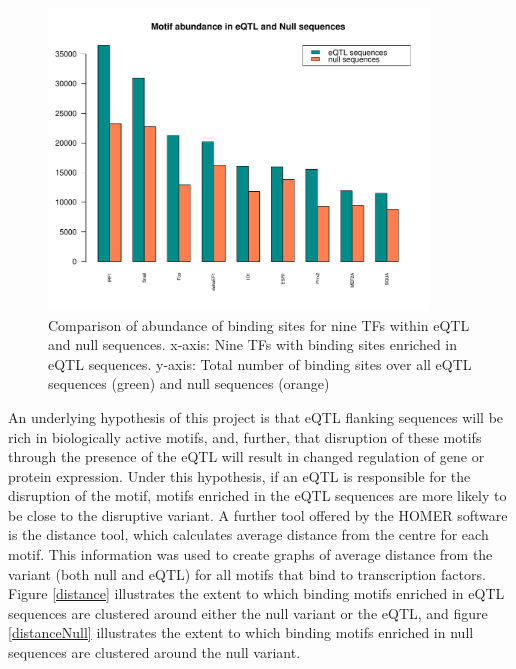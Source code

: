 \documentclass[12pt]{article}
\begin{document}
\begin{figure}[!htbp]
\centering
\includegraphics[width= 0.9\textwidth]{Top9TFsComparison.pdf} 
\caption{Comparison of abundance of binding sites for nine TFs within eQTL and null sequences. x-axis: Nine TFs with binding sites enriched in eQTL sequences. y-axis: Total number of binding sites over all eQTL sequences (green) and null sequences (orange)} 
\label{top9Comparison}
\end{figure}

An underlying hypothesis of this project is that eQTL flanking sequences will be rich in biologically active motifs, and, further, that disruption of these motifs through the presence of the eQTL will result in changed regulation of gene or protein expression. Under this hypothesis, if an eQTL is responsible for the disruption of the motif, motifs enriched in the eQTL sequences are more likely to be close to the disruptive variant. A further tool offered by the HOMER software is the distance tool, which calculates average distance from the centre for each motif. This information was used to create graphs of average distance from the variant (both null and eQTL) for all motifs that bind to transcription factors. Figure \ref{distance} illustrates the extent to which binding motifs enriched in eQTL sequences are clustered around either the null variant or the eQTL, and figure \ref{distanceNull} illustrates the extent to which binding motifs enriched in null sequences are clustered around the null variant. 
\end{document}
